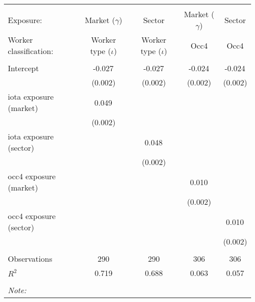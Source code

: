 \begin{tabular}{@{\extracolsep{5pt}}lcccc}
\\[-1.8ex]\hline
\hline \\[-1.8ex]
\hline \\[-1.8ex]
 Exposure: & Market ($\gamma$) & Sector & Market ($\gamma$) & Sector \\
 Worker classification: & Worker type ($\iota$) & Worker type ($\iota$) & Occ4 & Occ4 \\
 \hline &  &  &  &  \\
 Intercept & -0.027$^{}$ & -0.027$^{}$ & -0.024$^{}$ & -0.024$^{}$ \\
  & (0.002) & (0.002) & (0.002) & (0.002) \\
 iota exposure (market) & 0.049$^{}$ & & & \\
  & (0.002) & & & \\
 iota exposure (sector) & & 0.048$^{}$ & & \\
  & & (0.002) & & \\
 occ4 exposure (market) & & & 0.010$^{}$ & \\
  & & & (0.002) & \\
 occ4 exposure (sector) & & & & 0.010$^{}$ \\
  & & & & (0.002) \\
\hline \\[-1.8ex]
 Observations & 290 & 290 & 306 & 306 \\
 $R^2$ & 0.719 & 0.688 & 0.063 & 0.057 \\
\hline
\hline \\[-1.8ex]
\textit{Note:}\end{tabular}